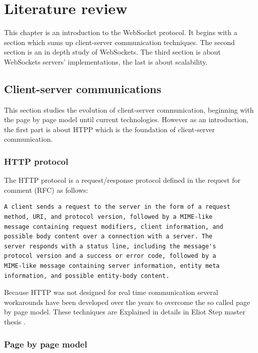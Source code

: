 \chapter{Literature review} 
\label{Chapter1} 

This chapter is an introduction to the WebSocket protocol.  It begins with a
section which sums up client-server communication techniques.  The second
section is an in depth study of WebSockets. The third section is about 
WebSockets servers' implementations, the last is about scalability. 

\section{Client-server communications}

This section studies the evolution of client-server communication, beginning
with the page by page model until current technologies. However as an
introduction, the first part is about HTPP which is the foundation of
client-server communication.

\subsection{HTTP protocol}

The HTTP protocol is a request/response protocol defined in the request for
comment (RFC) \cite{Reference1} as follows:

\begin{verbatim} 
A client sends a request to the server in the form of a request 
method, URI, and protocol version, followed by a MIME-like 
message containing request modifiers, client information, and 
possible body content over a connection with a server. The 
server responds with a status line, including the message's
protocol version and a success or error code, followed by a 
MIME-like message containing server information, entity meta 
information, and possible entity-body content.  
\end{verbatim}

Because HTTP was not designed for real time communication several workarounds
have been developed over the years to overcome the so called page by page
model. These techniques are Explained in details in Eliot Step master thesis
\citep{Reference2}.

\subsection{Page by page model}

